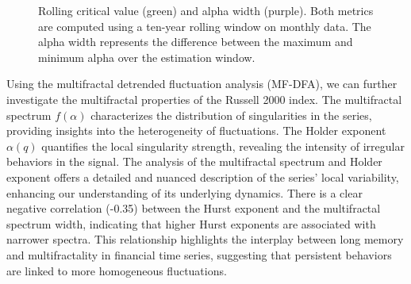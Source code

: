 \documentclass[11pt]{extarticle}
\begin{document}
\begin{figure}[htbp]

\caption{Rolling critical value (green) and alpha width (purple).
Both metrics are computed using a ten-year rolling window on monthly data.
The alpha width represents the difference between the maximum and minimum alpha over the estimation window.}
\end{figure}

\FloatBarrier

Using the multifractal detrended fluctuation analysis (MF-DFA), we can further investigate the multifractal properties of the Russell 2000 index.
The multifractal spectrum $f(\alpha)$ characterizes the distribution of singularities in the series, providing insights into the heterogeneity of fluctuations.
The Holder exponent $\alpha(q)$ quantifies the local singularity strength, revealing the intensity of irregular behaviors in the signal.
The analysis of the multifractal spectrum and Holder exponent offers a detailed and nuanced description of the series' local variability, enhancing our understanding of its underlying dynamics.
There is a clear negative correlation (-0.35) between the Hurst exponent and the multifractal spectrum width, indicating that higher Hurst exponents are associated with narrower spectra.
This relationship highlights the interplay between long memory and multifractality in financial time series, suggesting that persistent behaviors are linked to more homogeneous fluctuations.
\end{document}
